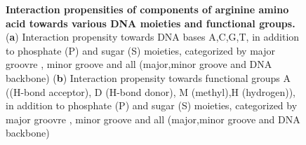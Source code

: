 \begin{center}
    \begin{figure}
        \caption[Interaction propensities of components of arginine amino acid towards various DNA moieties and functional groups]{\textbf{ Interaction propensities of components of arginine amino acid towards various DNA moieties and functional groups.} ({\bf a}) Interaction  propensity towards DNA bases 	A,C,G,T, in addition to phosphate (P) and sugar (S) moieties, categorized by major groovre , minor groove and all (major,minor groove and DNA backbone) ({\bf b}) Interaction  propensity towards functional groups \citep{Chiu2023} A ((H-bond acceptor), D (H-bond donor), M (methyl),H (hydrogen)), in addition to phosphate (P) and sugar (S) moieties, categorized by major groovre , minor groove and all (major,minor groove and DNA backbone)}
  \label{fig:arg}
\end{figure}
\end{center}